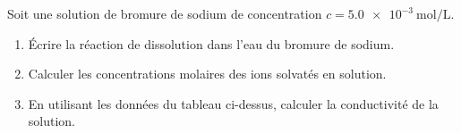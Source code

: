 Soit une solution de bromure de sodium  de concentration
$c=\qty{5.0e-3}{\mol\per\L}$.
\begin{enumerate}
    \item Écrire la réaction de dissolution dans l'eau du bromure de sodium.
    \item Calculer les concentrations molaires des ions solvatés en solution.
    \item En utilisant les données du tableau ci-dessus, calculer la
          conductivité de la solution.
\end{enumerate}


